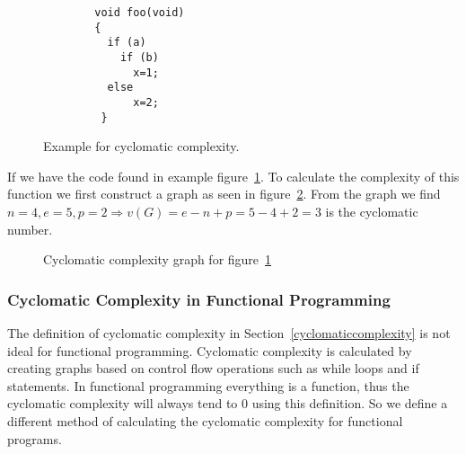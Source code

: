 \documentclass[12pt]{article}
\theoremstyle{definition}
\theoremstyle{theorem}
\begin{document}
\begin{figure}[H]
    \begin{lstlisting}
        void foo(void)
        {
          if (a)
            if (b) 
              x=1;
          else
              x=2;
         }
    \end{lstlisting}
    \caption{Example for cyclomatic complexity.}\label{c1excode}
\end{figure}

If we have the code found in example figure~\ref{c1excode}. To calculate the
complexity of this function we first construct a graph as seen in
figure~\ref{fig:c1exgraph}. From the graph we find $n=4, e=5, p=2\Rightarrow
v(G)=e-n+p=5-4+2=3$ is the cyclomatic number.

\begin{figure}[H]
    \centering
    \caption{Cyclomatic complexity graph for figure~\ref{c1excode}}\label{fig:c1exgraph}
\end{figure}

\subsubsection{Cyclomatic Complexity in Functional Programming}

The definition of cyclomatic complexity in Section~\ref{cyclomaticcomplexity} is
not ideal for functional programming. Cyclomatic complexity is calculated by
creating graphs based on control flow operations such as while loops and if
statements. In functional programming everything is a function, thus the
cyclomatic complexity will always tend to 0 using this definition. So we define
a different method of calculating the cyclomatic complexity for functional
programs. 
\end{document}
